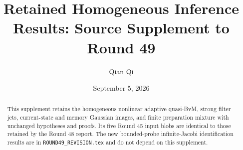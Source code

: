 \documentclass[11pt,reqno]{amsart}
\title{Retained Homogeneous Inference Results: Source Supplement to Round 49}
\author{Qian Qi}
\date{September 5, 2026}
\begin{document}
\begin{abstract}
This supplement retains the homogeneous nonlinear adaptive quasi-BvM, strong
filter jets, current-state and memory Gaussian images, and finite preparation
mixture with unchanged hypotheses and proofs. Its five Round 45 input blobs
are identical to those retained by the Round 48 report. The new bounded-probe
infinite-Jacobi identification results are in \texttt{ROUND49\_REVISION.tex}
and do not depend on this supplement.
\end{abstract}
\maketitle\tableofcontents




\end{document}
